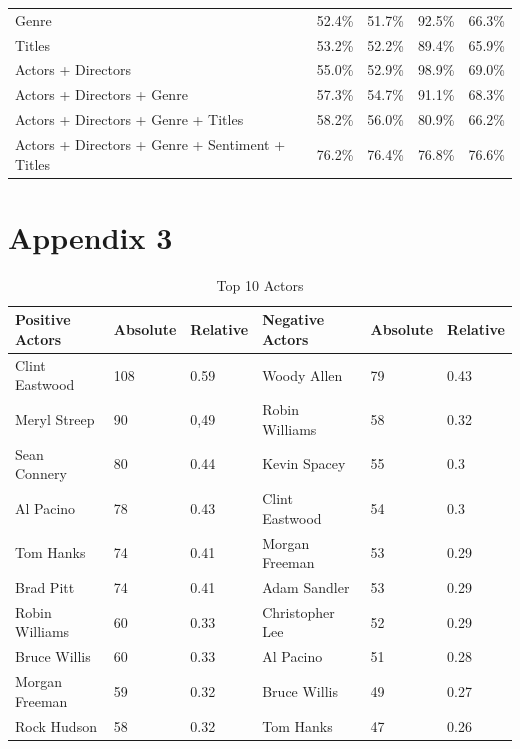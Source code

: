 \documentclass[
10pt, %
a4paper, %
oneside, %
headinclude,footinclude, %
] {book}%
\begin{document}
\begin{table}[hbtp]
\begin{tabular}{@{}lllll@{}}
Genre                             & 52.4\%         & 51.7\%          & 92.5\%       & 66.3\%         \\
Titles                            & 53.2\%         & 52.2\%          & 89.4\%       & 65.9\%         \\
Actors + Directors                        & 55.0\%         & 52.9\%          & 98.9\%       & 69.0\%         \\
Actors + Directors + Genre                        & 57.3\%         & 54.7\%          & 91.1\%       & 68.3\%         \\
Actors + Directors + Genre + Titles                       & 58.2\%         & 56.0\%          & 80.9\%       & 66.2\%         \\
Actors + Directors + Genre + Sentiment + Titles                    & 76.2\%         & 76.4\%          & 76.8\%       & 76.6\%         \\ \bottomrule
\end{tabular}
\end{table}

\chapter*{Appendix 3}

\begin{table}[hbtp]
\centering
\caption{Top 10 Actors}
\label{Table 6}
\begin{tabular}{@{}llllll@{}}
\toprule
Positive Actors & Absolute & Relative & Negative Actors & Absolute & Relative \\ \midrule
Clint Eastwood  & 108        & 0.59       & Woody Allen     & 79         & 0.43       \\
Meryl Streep    & 90         & 0,49      & Robin Williams  & 58         & 0.32       \\
Sean Connery    & 80         & 0.44       & Kevin Spacey    & 55         & 0.3       \\
Al Pacino       & 78         & 0.43        & Clint Eastwood  & 54         & 0.3       \\
Tom Hanks       & 74         & 0.41       & Morgan Freeman  & 53         & 0.29       \\
Brad Pitt       & 74         & 0.41       & Adam Sandler    & 53         & 0.29       \\
Robin Williams  & 60         & 0.33       & Christopher Lee & 52         & 0.29       \\
Bruce Willis    & 60         & 0.33       & Al Pacino       & 51         & 0.28       \\
Morgan Freeman  & 59         & 0.32        & Bruce Willis    & 49         & 0.27       \\ 
Rock Hudson  & 58         & 0.32        & Tom Hanks    & 47         & 0.26       \\ \bottomrule
\end{tabular}
\end{table}
\end{document}

